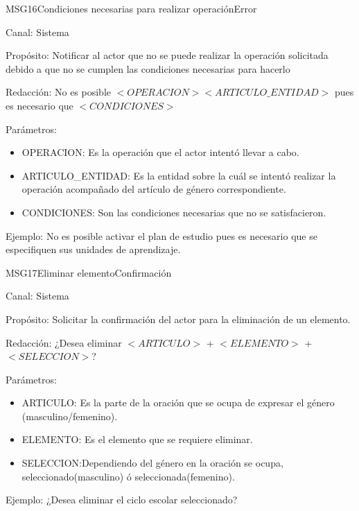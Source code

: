 \begin{mensaje}{MSG16}{Condiciones necesarias para realizar operación}{Error}
	\item[Canal:] Sistema
	\item[Propósito:] Notificar al actor que no se puede realizar la operación solicitada debido a que no se cumplen las condiciones necesarias para hacerlo
	\item[Redacción:] No es posible $<OPERACION> <ARTICULO\_ENTIDAD>$ pues es necesario que $<CONDICIONES>$
	\item[Parámetros:] 
	\begin{itemize}
		\item OPERACION: Es la operación que el actor intentó llevar a cabo.
		\item ARTICULO\_ENTIDAD: Es la entidad sobre la cuál se intentó realizar la operación acompañado del artículo de género correspondiente.
		\item CONDICIONES: Son las condiciones necesarias que no se satisfacieron.
	\end{itemize}
	\item[Ejemplo:] No es posible activar el plan de estudio pues es necesario que se especifiquen sus unidades de aprendizaje.
	
	
\end{mensaje}

\begin{mensaje}{MSG17}{Eliminar elemento}{Confirmación}
	\item[Canal:] Sistema
	\item[Propósito:] Solicitar la confirmación del actor para la eliminación de un elemento.
	\item[Redacción:] ¿Desea eliminar $<ARTICULO>$ + $<ELEMENTO>$ + $<SELECCION>$?
	\item[Parámetros:] 
	\begin{itemize}
		\item ARTICULO: Es la parte de la oración que se ocupa de expresar el género (masculino/femenino).
		\item ELEMENTO: Es el elemento que se requiere eliminar.
		\item SELECCION:Dependiendo del género en la oración se ocupa, seleccionado(masculino)  ó seleccionada(femenino).
	\end{itemize}
	\item[Ejemplo:] ¿Desea eliminar el ciclo escolar seleccionado?
	
\end{mensaje}

